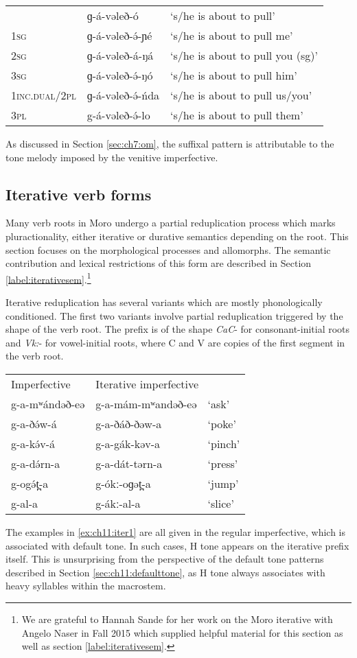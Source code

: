 \ea 
\begin{tabular}[t]{lll}
&	ɡ-á-vəleð-ó	&	‘s/he is about to pull’\\
\textsc{1sg}	&	ɡ-á-vəleð-ə́-ɲé	&	‘s/he is about to pull me’\\
\textsc{2sg}	&	ɡ-á-vəleð-á-ŋá	&	‘s/he is about to pull you (sg)’\\
\textsc{3sg}	&	ɡ-á-vəleð-ə́-ŋó	&	‘s/he is about to pull him’\\
\textsc{1inc.dual}/\textsc{2pl}&	ɡ-á-vəleð-ə́-ńda&	‘s/he is about to pull us/you’\\
\textsc{3pl}	&	g-á-vəleð-ə́-lo	&	‘s/he is about to pull them’\\ 	
\end{tabular}
\z 
As discussed in Section \ref{sec:ch7:om}, the suffixal pattern is attributable to the tone melody imposed by the venitive imperfective.


\subsection{Iterative verb forms}\label{sec:ch11:iterative}

Many verb roots in Moro undergo a partial reduplication process which marks pluractionality, either iterative or durative semantics depending on the root. This section focuses on the morphological processes and allomorphs. The semantic contribution and lexical restrictions of this form are described in Section \ref{label:iterativesem}.\footnote{We are grateful to Hannah Sande for her work on the Moro iterative with Angelo Naser in Fall 2015 which supplied helpful material for this section as well as section \ref{label:iterativesem}.}

Iterative reduplication has several variants which are mostly phonologically conditioned. The first two variants involve partial reduplication triggered by the shape of the verb root. The prefix is of the shape \textit{CaC}- for consonant-initial roots and \textit{Vk:}- for vowel-initial roots, where C and V are copies of the first segment in the verb root. 

\ea  \label{ex:ch11:iter1}
\begin{tabular}[t]{lll}
Imperfective	&	\multicolumn{2}{l}{Iterative imperfective}\\
g-a-mʷándəð-eə 	&	g-a-mám-mʷandəð-eə	&	‘ask’\\
g-a-ðə́w-á		&	g-a-ðáð-ðəw-a		&	‘poke’\\
g-a-kə́v-á		&	g-a-gák-kəv-a		&	‘pinch’\\
g-a-də́rn-a		&	g-a-dát-tərn-a		&	‘press’\\
g-ogə́t̪-a			&	g-ókː-oɡət̪-a			&	‘jump’\\
g-al-a			&	g-ákː-al-a			&	‘slice’\\ 	
\end{tabular}
\z 
The examples in \ref{ex:ch11:iter1} are all given in the regular imperfective, which is associated with default tone. In such cases, H tone appears on the iterative prefix itself. This is unsurprising from the perspective of the default tone patterns described in Section \ref{sec:ch11:defaulttone}, as H tone always associates with heavy syllables within the macrostem.

